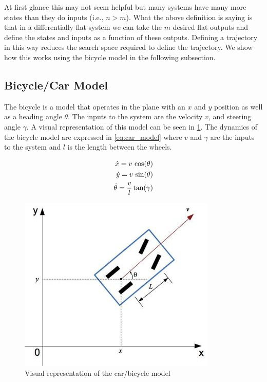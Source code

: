\documentclass{article}
\begin{document}
At first glance this may not seem helpful but many systems have many more states than they do 
inputs (i.e., $n > m$). What the above definition is saying is that in a differentially flat
system we can take the $m$ desired flat outputs and define the states and inputs as a function 
of these outputs. Defining a trajectory in this way reduces the search space required to 
define the trajectory. We show how this works using the bicycle model in the following subsection.

\subsection{Bicycle/Car Model}

The bicycle is a model that operates in the plane with an $x$ and $y$ position as well as a 
heading angle $\theta$. The inputs to the system are the velocity $v$, and steering angle $\gamma$.
A visual representation of this model can be seen in \cref{fig:bicycle_model}.
The dynamics of the bicycle model are expressed in \cref{eq:car_model} where $v$ and $\gamma$
are the inputs to the system and $l$ is the length between the wheels.

\begin{equation}
  \centering
\begin{aligned}
  \dot{x} = v\,\cos(\theta) \\
  \dot{y} = v\,\sin(\theta) \\
  \dot{\theta} = \frac{v}{l}\tan(\gamma)
\end{aligned}
\label{eq:car_model}
\end{equation}

\begin{figure}[bth]
  \centering
  \includegraphics[scale=0.5]{car_model.jpg}
  \caption{Visual representation of the car/bicycle model\label{fig:bicycle_model}}
\end{figure}
\end{document}
